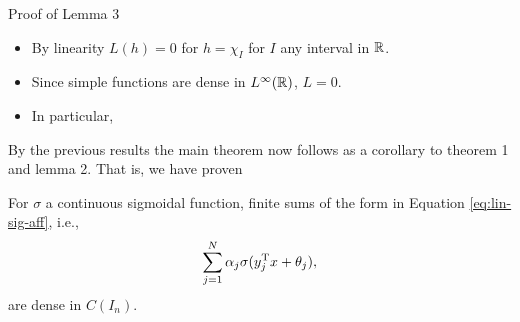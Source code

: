 \documentclass[11pt,letterpaper]{beamer}
\begin{document}
\begin{frame}{Proof of Lemma 3}
  \begin{itemize}
  \item By linearity $L(h)=0$ for $h=\chi_{I}$ for $I$ any interval in $\mathbb{R}$.
  \item Since simple functions are dense in $L^\infty(\mathbb{R})$, $L=0$.
  \item In particular, 
  \end{itemize}
\end{frame}

\begin{frame}
  By the previous results the main theorem now follows as a corollary to theorem
  1 and lemma 2. That is, we have proven
  \begin{theorem}[Theorem 2 in C89]
    For $\sigma$ a continuous sigmoidal function, finite sums of the form in
    Equation \eqref{eq:lin-sig-aff}, i.e.,
    \[
      \sum_{j=1}^N \alpha_j\sigma( y_j^{\mathrm{T}} x+\theta_j),
    \]
  are dense in $C(I_n)$.
  \end{theorem}
\end{frame}
\end{document}
